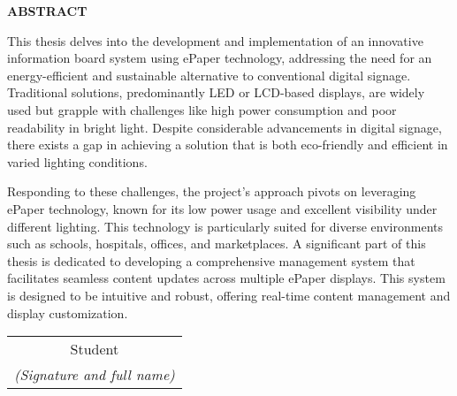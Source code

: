 \documentclass[../DoAn.tex]{subfiles}
\begin{document}
\begin{center}
    \Large{\textbf{ABSTRACT}}\\
\end{center}
\vspace{1cm}
This thesis delves into the development and implementation of an innovative information board system using ePaper technology, addressing the need for an energy-efficient and sustainable alternative to conventional digital signage. Traditional solutions, predominantly LED or LCD-based displays, are widely used but grapple with challenges like high power consumption and poor readability in bright light. Despite considerable advancements in digital signage, there exists a gap in achieving a solution that is both eco-friendly and efficient in varied lighting conditions.

Responding to these challenges, the project's approach pivots on leveraging ePaper technology, known for its low power usage and excellent visibility under different lighting. This technology is particularly suited for diverse environments such as schools, hospitals, offices, and marketplaces. A significant part of this thesis is dedicated to developing a comprehensive management system that facilitates seamless content updates across multiple ePaper displays. This system is designed to be intuitive and robust, offering real-time content management and display customization.
\begin{flushright}
\begin{tabular}{@{}c@{}}
Student\\
\textit{(Signature and full name)}
\end{tabular}
\end{flushright}
\end{document}
